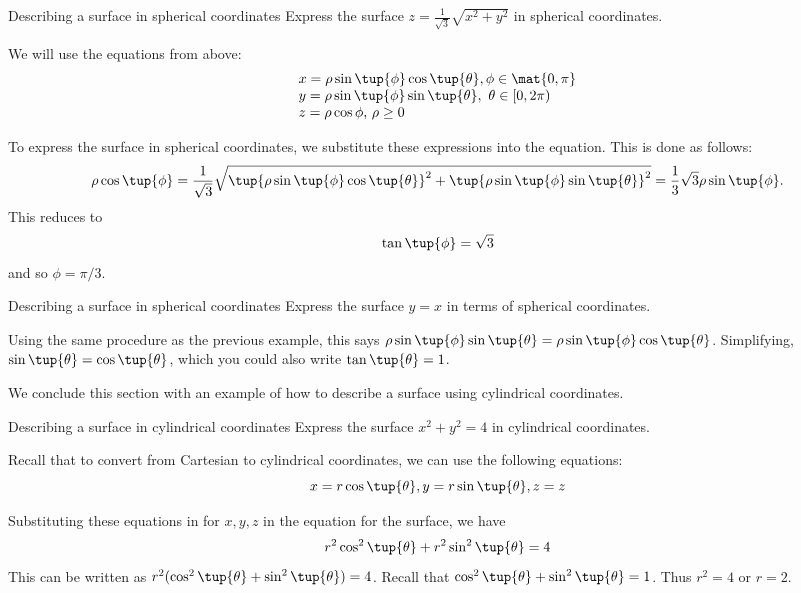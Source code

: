 \begin{example}{Describing a surface in spherical coordinates}{}
Express the surface $z=\frac{1}{\sqrt{3}}\sqrt{x^{2}+y^{2}}$ in spherical
coordinates.
\end{example}

\begin{solution}
We will use the equations from above:
\[
\begin{array}{l}
x =\rho \sin \tup{\phi } \cos \tup{\theta }, \phi \in 
\mat{0,\pi}\\
 y =\rho \sin \tup{\phi } \sin \tup{\theta } ,\text{ }\theta
\in \lbrack 0,2\pi ) \\
 z =\rho \cos \phi \text{, }\rho \geq 0
\end{array}
\]

To express the surface in spherical coordinates, we substitute these expressions into the equation.  
This is done as follows:
\begin{equation*}
\rho \cos \tup{\phi } =\frac{1}{\sqrt{3}}\sqrt{\tup{\rho \sin
\tup{\phi } \cos \tup{\theta } } ^{2}+\tup{\rho \sin
\tup{\phi } \sin \tup{\theta } } ^{2}}=\allowbreak 
\frac{1}{3}\sqrt{3}\rho \sin \tup{\phi }.
\end{equation*}
This reduces to 
\begin{equation*}
\tan \tup{\phi }=\sqrt{3}
\end{equation*}
and so $\phi =\pi /3$.
\end{solution}

\begin{example}{Describing a surface in spherical coordinates}{}
Express the surface $y=x$ in terms of spherical coordinates.
\end{example}

\begin{solution}
Using the same procedure as the previous example, this says $\allowbreak \rho \sin \tup{\phi } \sin \tup{\theta
} =\rho \sin \tup{\phi } \cos \tup{\theta }$. Simplifying,  $\sin \tup{\theta } =\cos \tup{\theta }$, which you could also write $\tan \tup{\theta }=1$.
\end{solution}

We conclude this section with an example of how to describe a surface using cylindrical coordinates. 

\begin{example}{Describing a surface in cylindrical coordinates}{}
Express the surface $x^{2}+y^{2}=4$ in cylindrical coordinates.
\end{example}

\begin{solution}
Recall that to convert from Cartesian to cylindrical coordinates, we can use the following equations:
\[
x =r\cos \tup{\theta } , y=r\sin \tup{\theta } , z =z
\]

Substituting these equations in for $x,y,z$ in the equation for the surface, we have  
\[
r^{2}\cos ^{2} \tup{\theta } +r^{2}\sin ^{2} \tup{\theta }=4
\]
This can be written as $r^2 ( \cos^{2} \tup{\theta }+ \sin^{2} \tup{\theta} ) = 4$. Recall that $ \cos^{2} \tup{\theta }+ \sin^{2} \tup{\theta }=1$.  Thus $r^{2} = 4$ or $r=2$.
\end{solution}

